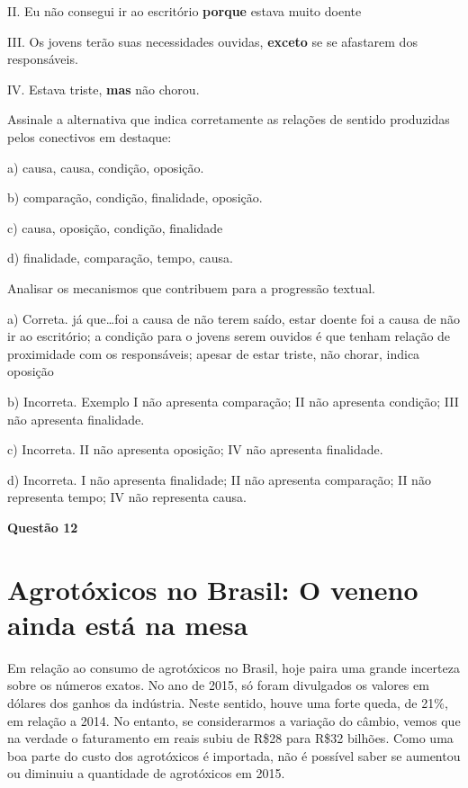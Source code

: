 II. Eu não consegui ir ao escritório \textbf{porque} estava muito doente

III. Os jovens terão suas necessidades ouvidas, \textbf{exceto} se se
afastarem dos responsáveis.

IV. Estava triste, \textbf{mas} não chorou.

Assinale a alternativa que indica corretamente as relações de sentido
produzidas pelos conectivos em destaque:

a) causa, causa, condição, oposição.

b) comparação, condição, finalidade, oposição.

c) causa, oposição, condição, finalidade

d) finalidade, comparação, tempo, causa.

Analisar os mecanismos que contribuem para a progressão textual.

a) Correta. já que\ldots foi a causa de não terem saído, estar doente
foi a causa de não ir ao escritório; a condição para o jovens serem
ouvidos é que tenham relação de proximidade com os responsáveis; apesar
de estar triste, não chorar, indica oposição

b) Incorreta. Exemplo I não apresenta comparação; II não apresenta
condição; III não apresenta finalidade.

c) Incorreta. II não apresenta oposição; IV não apresenta finalidade.

d) Incorreta. I não apresenta finalidade; II não apresenta comparação;
II não representa tempo; IV não representa causa.

\textbf{Questão 12}

\hypertarget{agrotuxf3xicos-no-brasil-o-veneno-ainda-estuxe1-na-mesa}{%
\section{Agrotóxicos no Brasil: O veneno ainda está na
mesa}\label{agrotuxf3xicos-no-brasil-o-veneno-ainda-estuxe1-na-mesa}}

Em relação ao consumo de agrotóxicos no Brasil, hoje paira uma grande
incerteza sobre os números exatos. No ano de 2015, só foram divulgados
os valores em dólares dos ganhos da indústria. Neste sentido, houve uma
forte queda, de 21\%, em relação a 2014. No entanto, se considerarmos a
variação do câmbio, vemos que na verdade o faturamento em reais subiu de
R\$28 para R\$32 bilhões. Como uma boa parte do custo dos agrotóxicos é
importada, não é possível saber se aumentou ou diminuiu a quantidade de
agrotóxicos em 2015.


